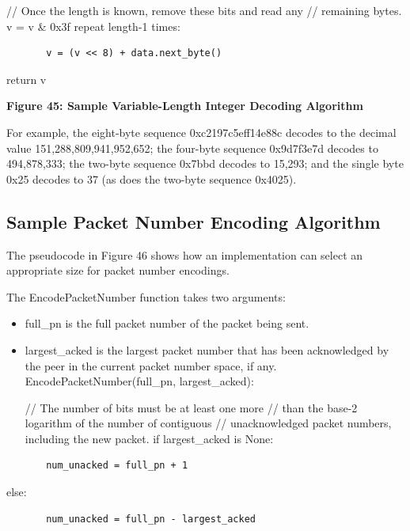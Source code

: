 \documentclass{article}
\begin{document}
// Once the length is known, remove these bits and read any // remaining bytes. v = v \& 0x3f repeat length-1 times:

\begin{verbatim}
       v = (v << 8) + data.next_byte()
\end{verbatim}

return v

\begin{center}
\textbf{Figure 45: Sample Variable-Length Integer Decoding Algorithm}
\end{center}

For example, the eight-byte sequence 0xc2197c5eff14e88c decodes to the decimal value 151,288,809,941,952,652; the four-byte sequence 0x9d7f3e7d decodes to 494,878,333; the two-byte sequence 0x7bbd decodes to 15,293; and the single byte 0x25 decodes to 37 (as does the two-byte sequence 0x4025).

\subsection{Sample Packet Number Encoding Algorithm}

The pseudocode in Figure 46 shows how an implementation can select an appropriate size for packet number encodings.

The EncodePacketNumber function takes two arguments:

\begin{itemize}
\item full\_pn is the full packet number of the packet being sent.
\item largest\_acked is the largest packet number that has been acknowledged by the peer in the current packet number space, if any.
EncodePacketNumber(full\_pn, largest\_acked):

// The number of bits must be at least one more // than the base-2 logarithm of the number of contiguous // unacknowledged packet numbers, including the new packet. if largest\_acked is None:

\end{itemize}
\begin{verbatim}
       num_unacked = full_pn + 1
\end{verbatim}

else:

\begin{verbatim}
       num_unacked = full_pn - largest_acked
\end{verbatim}
\end{document}
